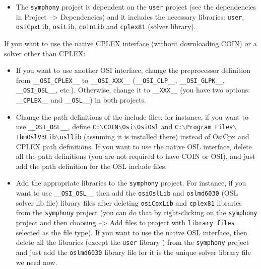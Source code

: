 \begin{itemize}
\begin{itemize}
\item The \texttt{symphony} project is dependent on the \texttt{user} project
(see the dependencies in Project --> Dependencies) and it includes the
necessary libraries: \texttt{user}, \texttt{osiCpxLib}, \texttt{osiLib},
\texttt{coinLib} and \texttt{cplex81} (solver library).

\end{itemize}

If you want to use the native CPLEX interface (without downloading COIN) or a
solver other than CPLEX:

\begin{itemize}

\item If you want to use another OSI interface, change the preprocessor
definition from \texttt{\_\_OSI\_CPLEX\_\_} to \texttt{\_\_OSI\_XXX\_\_}
(\texttt{\_\_OSI\_CLP\_\_}, \texttt{\_\_OSI\_GLPK\_\_}, \texttt{\_\_OSI\_OSL\_\_},
etc.). Otherwise, change it to \texttt{\_\_XXX\_\_} (you have two options:
\texttt{\_\_CPLEX\_\_} and \texttt{\_\_OSL\_\_}) in both projects.

\item Change the path definitions of the include files: for instance, if you want
to use \texttt{\_\_OSI\_OSL\_\_}, define
\texttt{C:$\backslash$COIN$\backslash$Osi$\backslash$OsiOsl} and \texttt{C:$\backslash$Program
Files$\backslash$IbmOslV3Lib$\backslash$osllib} (assuming it is installed
there) instead of OsiCpx and CPLEX path definitions. If you want to use the
native OSL interface, delete all the path definitions (you are not required to
have COIN or OSI), and just add the path definition for the OSL include files.

\item Add the appropriate libraries to the \texttt{symphony} project. For
instance, if you want to use \texttt{\_\_OSI\_OSL\_\_} then add the
\texttt{osiOslLib} and \texttt{oslmd6030} (OSL solver lib file) library files
after deleting \texttt{osiCpxLib} and \texttt{cplex81} libraries from the
\texttt{symphony} project (you can do that by right-clicking on the
\texttt{symphony} project and then choosing --> Add files to project with
\texttt{library files} selected as the file type). If 
you want to use the native OSL interface, then delete all the libraries
(except the \texttt{user} library ) from the \texttt{symphony} project and
just add the \texttt{oslmd6030} library file for it is the unique solver
library file we need now.

\end{itemize}


\end{itemize}
